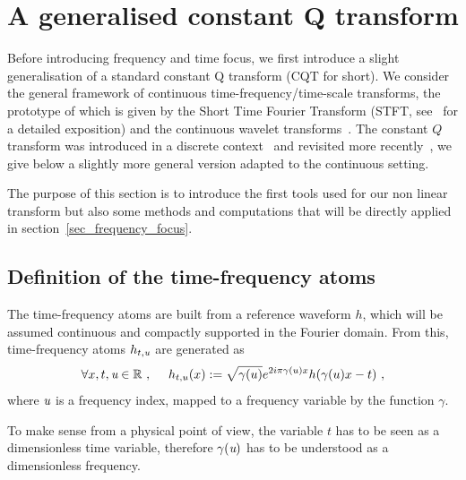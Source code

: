 \section{A generalised constant Q transform}\label{sec_CSQT}

Before introducing frequency and time focus, we first introduce a slight generalisation of a standard constant Q transform (CQT for short). We consider the general framework of continuous time-frequency/time-scale transforms, the prototype of which is given by the Short Time Fourier Transform (STFT, see~\cite{grochenig2013foundations} for a detailed exposition) and the continuous wavelet transforms~\cite{Grossmann1984decomposition}.
The constant $Q$ transform was introduced in a discrete context~\cite{Brown1991calculation} and revisited more recently~\cite{velasco2011constructing,holighaus2012framework}, we give below a slightly more general version adapted to the continuous setting.

The purpose of this section is to introduce the first tools used for our non linear transform but also some methods and computations that will be directly applied in section~\ref{sec_frequency_focus}.

\subsection{Definition of the time-frequency atoms}
The time-frequency atoms are built from a reference waveform $h$, which will be assumed continuous and compactly supported in the Fourier domain.  From this, time-frequency atoms $h_{t,\textit{u}}$ are generated as
\begin{equation}
	\forall x,t,\textit{u}\in\mathbb{R}\ ,\quad \ h_{t,u}(x) := \sqrt{\gamma(u)}e^{2i\pi\gamma(u)x}h(\gamma(u)x-t)\ ,
\end{equation}
where $\textit{u}$ is a frequency index, mapped to a frequency variable by the function $\gamma$.
\begin{remark}
    To make sense from  a physical point of view, the variable $t$ has to be seen as a dimensionless time variable, therefore $\gamma(\textit{u})$ has to be understood as a dimensionless frequency.
\end{remark} 

